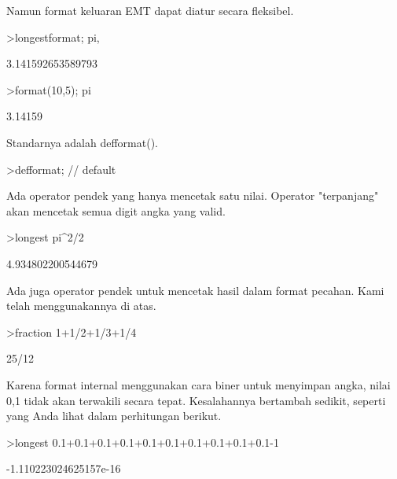 \documentclass[a4paper,10pt]{article}
\begin{document}
\begin{eulernotebook}
\begin{eulercomment}
Namun format keluaran EMT dapat diatur secara fleksibel.
\end{eulercomment}
\begin{eulerprompt}
>longestformat; pi,
\end{eulerprompt}
\begin{euleroutput}
  3.141592653589793
\end{euleroutput}
\begin{eulerprompt}
>format(10,5); pi
\end{eulerprompt}
\begin{euleroutput}
    3.14159 
\end{euleroutput}
\begin{eulercomment}
Standarnya adalah defformat().
\end{eulercomment}
\begin{eulerprompt}
>defformat; // default
\end{eulerprompt}
\begin{eulercomment}
Ada operator pendek yang hanya mencetak satu nilai. Operator
"terpanjang" akan mencetak semua digit angka yang valid.
\end{eulercomment}
\begin{eulerprompt}
>longest pi^2/2
\end{eulerprompt}
\begin{euleroutput}
        4.934802200544679 
\end{euleroutput}
\begin{eulercomment}
Ada juga operator pendek untuk mencetak hasil dalam format pecahan.
Kami telah menggunakannya di atas.
\end{eulercomment}
\begin{eulerprompt}
>fraction 1+1/2+1/3+1/4
\end{eulerprompt}
\begin{euleroutput}
  25/12
\end{euleroutput}
\begin{eulercomment}
Karena format internal menggunakan cara biner untuk menyimpan angka,
nilai 0,1 tidak akan terwakili secara tepat. Kesalahannya bertambah
sedikit, seperti yang Anda lihat dalam perhitungan berikut.
\end{eulercomment}
\begin{eulerprompt}
>longest 0.1+0.1+0.1+0.1+0.1+0.1+0.1+0.1+0.1+0.1-1
\end{eulerprompt}
\begin{euleroutput}
   -1.110223024625157e-16 
\end{euleroutput}
\begin{eulercomment}

\end{eulercomment}
\end{eulernotebook}
\end{document}
